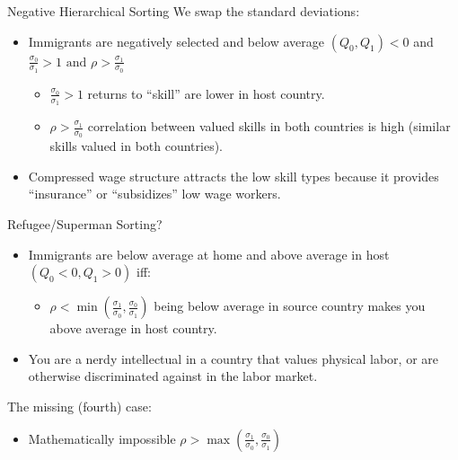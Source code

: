 \documentclass[aspectratio=169,11pt]{beamer}
\begin{document}
\begin{frame}{Negative Hierarchical Sorting}
We swap the standard deviations:
\begin{itemize}
\item Immigrants are negatively selected and below average $(Q_0,Q_1) < 0$ and $\frac{\sigma_{0}}{\sigma_{1}}>1 \text { and } \rho>\frac{\sigma_{1}}{\sigma_{0}}$
\begin{itemize}
\item $\frac{\sigma_{0}}{\sigma_{1}}>1$ returns to ``skill'' are lower in host country.
\item $\rho>\frac{\sigma_{1}}{\sigma_{0}}$ correlation between valued skills in both countries is high (similar skills valued in both countries).
\end{itemize}
\item Compressed wage structure attracts the low skill types because it provides ``insurance'' or ``subsidizes'' low wage workers.
\end{itemize}
\end{frame}

\begin{frame}{Refugee/Superman Sorting?}
\begin{itemize}
\item Immigrants are below average at home and above average in host $(Q_0<0 ,Q_1>0)$ iff:
\begin{itemize}
\item $\rho<\min \left(\frac{\sigma_{1}}{\sigma_{0}}, \frac{\sigma_{0}}{\sigma_{1}}\right)$ being below average in source country makes you above average in host country.
\end{itemize}
\item You are a nerdy intellectual in a country that values physical labor, or are otherwise discriminated against in the labor market.
\end{itemize}
The missing (fourth) case:
\begin{itemize}
\item Mathematically impossible $\rho>\max \left(\frac{\sigma_{1}}{\sigma_{0}}, \frac{\sigma_{0}}{\sigma_{1}}\right)$
\end{itemize}
\end{frame}
\end{document}
